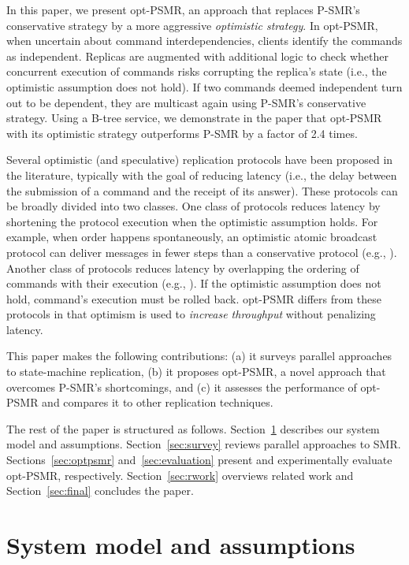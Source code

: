 \documentclass[conference]{IEEEtran}
\begin{document}
In this paper, we present opt-PSMR, an approach that 
replaces P-SMR's conservative strategy by a more aggressive \emph{optimistic strategy}.
In opt-PSMR, when uncertain about command interdependencies, clients identify the commands as independent. 
Replicas are augmented with additional logic to check whether concurrent execution of commands risks corrupting the replica's state (i.e., the optimistic assumption does not hold). 
If two commands deemed independent turn out to be dependent, they are multicast again using P-SMR's conservative strategy. 
Using a B-tree service, we demonstrate in the paper that opt-PSMR with its optimistic strategy outperforms P-SMR by a factor of 2.4 times. 

Several optimistic (and speculative) replication protocols have been proposed in the literature, typically with the goal of reducing latency (i.e., the delay between the submission of a command and the receipt of its answer).
These protocols can be broadly divided into two classes.
One class of protocols reduces latency by shortening the protocol execution when the optimistic assumption holds.
For example, when order happens spontaneously, an optimistic atomic broadcast protocol can deliver messages in fewer steps than a conservative protocol (e.g., \cite{PS98,Lam06,SousaPMO02}).
Another class of protocols reduces latency by overlapping the ordering of commands with their execution (e.g., \cite{JPPM02, KPAS99, marandi2011high}).
If the optimistic assumption does not hold, command's execution must be rolled back.
opt-PSMR differs from these protocols in that optimism is used to \emph{increase throughput} without penalizing latency.



This paper makes the following contributions: (a) it surveys parallel approaches to state-machine replication, (b) it proposes opt-PSMR, a novel approach that overcomes P-SMR's shortcomings, and (c) it assesses the performance of opt-PSMR and compares it to other replication techniques. 

The rest of the paper is structured as follows. 
Section~\ref{sec:model} describes our system model and assumptions. 
Section~\ref{sec:survey} reviews parallel approaches to SMR. 
Sections~\ref{sec:optpsmr} and~\ref{sec:evaluation} present and experimentally evaluate opt-PSMR, respectively. 
Section~\ref{sec:rwork} overviews related work and Section~\ref{sec:final} concludes the paper.

\section{System model and assumptions}
\label{sec:model}
\end{document}
